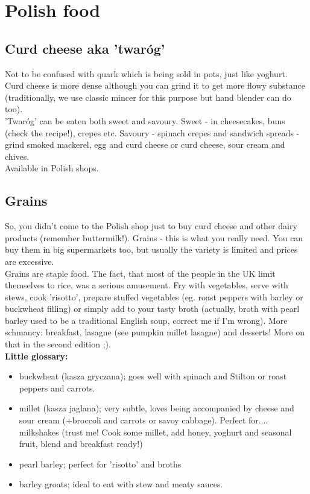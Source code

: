 \section*{Polish food}

\subsection*{Curd cheese aka 'twaróg'}

Not to be confused with quark which is being sold in pots, just like yoghurt.\\
Curd cheese is more dense although you can grind it to get more flowy substance (traditionally, we use classic mincer for this purpose but hand blender can do too).\\
'Twaróg' can be eaten both sweet and savoury. Sweet - in cheesecakes, buns (check the recipe!), crepes etc. Savoury - spinach crepes and sandwich spreads - grind smoked mackerel, egg and curd cheese or curd cheese, sour cream and chives.\\
Available in Polish shops.

\subsection*{Grains}
So, you didn't come to the Polish shop just to buy curd cheese and other dairy products (remember buttermilk!). Grains - this is what you really need. You can buy them in big supermarkets too, but usually the variety is limited and prices are excessive.\\
Grains are staple food. The fact, that most of the people in the UK limit themselves to rice, was a serious amusement. Fry with vegetables, serve with stews, cook 'risotto', prepare stuffed vegetables (eg. roast peppers with barley or buckwheat filling) or simply add to your tasty broth (actually, broth with pearl barley used to be a traditional English soup, correct me if I'm wrong). More schmancy: breakfast, lasagne (see pumpkin millet lasagne) and desserts! More on that in the second edition ;).\\
\textbf{Little glossary:}

\begin{itemize}
    \setlength\itemsep{0.1mm}
    \item buckwheat (kasza gryczana); goes well with spinach and Stilton or roast peppers and carrots. 
    \item millet (kasza jaglana); very subtle, loves being accompanied by cheese and sour cream (+broccoli and carrots or savoy cabbage). Perfect for.... milkshakes (trust me! Cook some millet, add honey, yoghurt and seasonal fruit, blend and breakfast ready!) 
    \item pearl barley; perfect for 'risotto' and broths
    \item barley groats; ideal to eat with stew and meaty sauces. 
\end{itemize}

